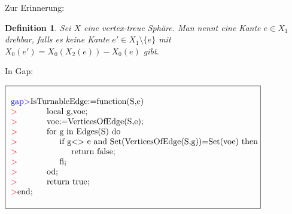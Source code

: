 \documentclass[12pt,titlepage,twoside,cleardoublepage]{article}
\theoremstyle{nummermitklammern}
\newtheorem{definition}[temp]{Definition}
\newtheorem{definition}[zahl]{Definition}
\numberwithin{equation}{section}
\begin{document}
Zur Erinnerung:
\begin{definition}
Sei $X$ eine vertex-treue Sphäre. Man nennt eine Kante $e\in X_1$ \emph{drehbar}, falls es keine Kante $e'\in X_1\setminus\{e\}$ mit $X_0(e')=X_0(X_2(e))-X_0(e)$ gibt.
\end{definition}
In Gap:
\begin{center}
$\fbox{
\parbox{26cm}{
\begin{tabbing}
\textcolor{blue}{gap$>$}IsTu\=rnableEdge:=function(S,e)\\
\textcolor{red}{$>$}\>    local g,voe;\\
\textcolor{red}{$>$}\>    voe:=VerticesOfEdge(S,e);\\
\textcolor{red}{$>$}\>    for \=g in Edges(S) do\\
\textcolor{red}{$>$}        \>\>if g\=$<>$ e and Set(VerticesOfEdge(S,g))=Set(voe)  then\\
\textcolor{red}{$>$}            \>\>\>return false;\\
\textcolor{red}{$>$}        \>\>fi;\\
\textcolor{red}{$>$}    \>od;\\
\textcolor{red}{$>$}\>    return true;\\
\textcolor{red}{$>$}end;
\end{tabbing}
}}$
\end{center}
\end{document}
